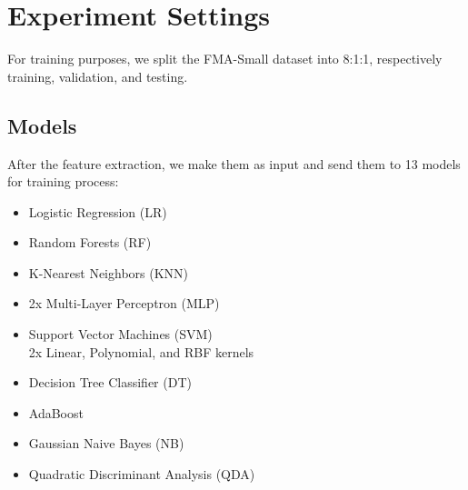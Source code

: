 \section{Experiment Settings}

For training purposes, we split the FMA-Small dataset into 8:1:1, respectively training, validation, and testing.

\subsection{Models}
After the feature extraction, we make them as input and send them to 13 models for training process:

\begin{itemize}
    \item Logistic Regression (LR)
    \item Random Forests (RF)
    \item K-Nearest Neighbors (KNN)
    \item 2x Multi-Layer Perceptron (MLP)
    \item Support Vector Machines (SVM)\\2x Linear, Polynomial, and RBF kernels
    \item Decision Tree Classifier (DT)
    \item AdaBoost
    \item Gaussian Naive Bayes (NB)
    \item Quadratic Discriminant Analysis (QDA)
\end{itemize}

